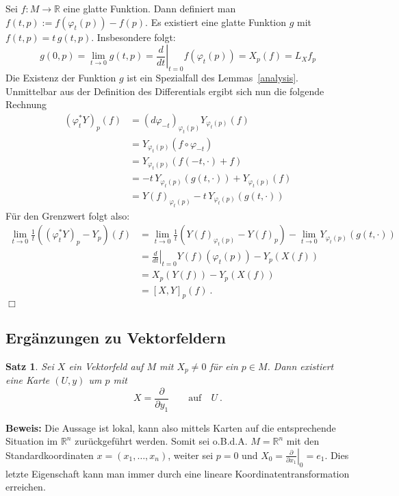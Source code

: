 \documentclass[12pt,a4paper]{article}
\def\R{\mathbb{R}}
\newtheorem{Satz}[Lemma]{Satz}
\def\proof{\noindent\textbf{Beweis:}\quad}
\def\qed{\quad\hfill\ensuremath{\Box}}
\begin{document}
\medskip

Sei $f:M\rightarrow \R$ eine glatte Funktion. Dann definiert man
$f(t,p) := f(\varphi_t(p))-f(p)$. Es existiert eine glatte Funktion $g$ mit
$f(t,p) = t \, g(t,p)$. Insbesondere folgt:
$$
g(0,p) = \lim_{t\rightarrow 0} g(t,p) =
\left. \frac{d}{dt}\right|_{t=0} f(\varphi_t(p)) = X_p(f) = L_X f_p
$$
Die Existenz der Funktion $g$ ist ein Spezialfall des Lemmas~\ref{analysis}.
Unmittelbar aus der Definition des Differentials ergibt sich nun die
folgende Rechnung
$$
\begin{array}{rl}
(\varphi_t^*Y)_p(f)
&=
(d\varphi_{-t})_{\varphi_{t}(p)} Y_{\varphi_{t}(p)}(f) \\[1ex]
&=
Y_{\varphi_{t}(p)}(f\circ \varphi_{-t})\\[1ex]
&=
Y_{\varphi_{t}(p)}(f(-t, \cdot) + f)\\[1ex]
&=
-t\,Y_{\varphi_{t}(p)}(g(t,\cdot)) + Y_{\varphi_{t}(p)}(f)\\[1ex]
&=
Y(f)_{\varphi_t(p)}-t\,Y_{\varphi_{t}(p)}(g(t,\cdot))
\end{array}
$$
F\"ur den Grenzwert folgt also:
$$
\begin{array}{rl}
\lim_{t\rightarrow 0} \frac1t ((\varphi_t^*Y)_p - Y_p)(f)
&=
\lim_{t\rightarrow 0}\frac1t ( Y(f)_{\varphi_t(p)}- Y(f)_p  ) -
\lim_{t\rightarrow 0} Y_{\varphi_t(p)}(g(t,\cdot))\\[1ex]
&=
\left. \frac{d}{dt}\right|_{t=0} Y(f)(\varphi_t(p)) - Y_p(X(f))\\[1ex]
&=
X_p(Y(f)) - Y_p(X(f))\\[1ex]
&=
[X,Y]_p(f) \ .
\end{array}
$$
\qed

\subsection{Erg\"anzungen zu Vektorfeldern}

\bigskip

\begin{Satz}\label{karte}
Sei $X$ ein Vektorfeld auf $M$ mit $X_p\neq 0$ f\"ur ein $p\in M$.
Dann existiert eine Karte $(U,y)$ um $p$ mit
$$
X = \left. \frac{\partial}{\partial y_1}\right.
\qquad \mbox{auf}\quad U \ .
$$
\end{Satz}
\proof
Die Aussage ist lokal, kann also mittels Karten auf die entsprechende
Situation im $\R^n$ zur\"uckgef\"uhrt werden. Somit sei o.B.d.A.
$M= \R^n$ mit den Standardkoordinaten $x=(x_1,\ldots, x_n)$, weiter
sei $p=0$ und $X_0 = \left. \frac{\partial}{\partial x_1}\right|_0 = e_1$.
Dies letzte Eigenschaft kann man immer durch eine lineare Koordinatentransformation
erreichen.
\end{document}

